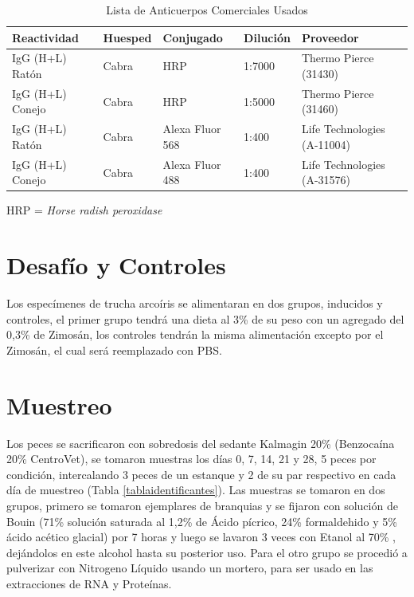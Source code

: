 \documentclass[12pt,a4paper,oneside]{scrbook}
\begin{document}
\begin{table}[h!]
\sffamily
  \begin{center}
    \begin{threeparttable}
      \caption{Lista de Anticuerpos Comerciales Usados}\label{tabla:anticuerpos-comerciales}
      \begin{tabular}{l l l l l}
    \toprule
    Reactividad & Huesped & Conjugado & Dilución & Proveedor \\
    \midrule
    IgG (H+L) Ratón & Cabra & HRP & 1:7000 & Thermo Pierce (31430) \\
    IgG (H+L) Conejo & Cabra & HRP & 1:5000 & Thermo Pierce (31460) \\
    IgG (H+L) Ratón & Cabra & Alexa Fluor 568 & 1:400 & Life Technologies (A-11004) \\
    IgG (H+L) Conejo & Cabra & Alexa Fluor 488 & 1:400 & Life Technologies (A-31576) \\
    \bottomrule
        \end{tabular}
\begin{tablenotes}
  \item *HRP = \emph{Horse radish peroxidase}
\end{tablenotes}
\end{threeparttable}
\end{center}
\end{table}

\section{Desafío y Controles}

Los especímenes de trucha arcoíris se alimentaran en dos grupos,
inducidos y controles, el primer grupo tendrá una dieta al 3\% de su
peso con un agregado del 0,3\% de Zimosán, los controles tendrán la
misma alimentación excepto por el Zimosán, el cual será reemplazado con
PBS.

\section{Muestreo}

Los peces se sacrificaron con sobredosis del sedante Kalmagin 20\%
(Benzocaína 20\% CentroVet), se tomaron muestras los días 0, 7, 14, 21 y
28, 5 peces por condición, intercalando 3 peces de un estanque y 2 de su
par respectivo en cada día de muestreo (Tabla
\ref{tablaidentificantes}). Las muestras se tomaron en dos grupos,
primero se tomaron ejemplares de branquias y se fijaron con solución de
Bouin (71\% solución saturada al 1,2\% de Ácido pícrico, 24\%
formaldehido y 5\% ácido acético glacial) por 7 horas y luego se lavaron
3 veces con Etanol al 70\% , dejándolos en este alcohol hasta su
posterior uso. Para el otro grupo se procedió a pulverizar con Nitrogeno
Líquido usando un mortero, para ser usado en las extracciones de RNA y
Proteínas.
\end{document}
